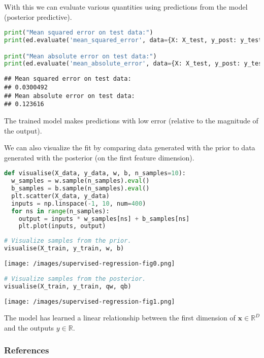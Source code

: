 With this we can evaluate various quantities using predictions from
the model (posterior predictive).
\begin{lstlisting}[language=Python]
print("Mean squared error on test data:")
print(ed.evaluate('mean_squared_error', data={X: X_test, y_post: y_test}))

print("Mean absolute error on test data:")
print(ed.evaluate('mean_absolute_error', data={X: X_test, y_post: y_test}))
\end{lstlisting}

\begin{lstlisting}
## Mean squared error on test data:
## 0.0300492
## Mean absolute error on test data:
## 0.123616
\end{lstlisting}

The trained model makes predictions with low error
(relative to the magnitude of the output).

We can also visualize the fit by comparing data generated with the
prior to data generated with the posterior (on the first feature
dimension).

\begin{lstlisting}[language=Python]
def visualise(X_data, y_data, w, b, n_samples=10):
  w_samples = w.sample(n_samples).eval()
  b_samples = b.sample(n_samples).eval()
  plt.scatter(X_data, y_data)
  inputs = np.linspace(-1, 10, num=400)
  for ns in range(n_samples):
    output = inputs * w_samples[ns] + b_samples[ns]
    plt.plot(inputs, output)
\end{lstlisting}

\begin{lstlisting}[language=Python]
# Visualize samples from the prior.
visualise(X_train, y_train, w, b)
\end{lstlisting}

\texttt{[image: /images/supervised-regression-fig0.png]}

\begin{lstlisting}[language=Python]
# Visualize samples from the posterior.
visualise(X_train, y_train, qw, qb)
\end{lstlisting}

\texttt{[image: /images/supervised-regression-fig1.png]}

The model has learned a linear relationship between the
first dimension of $\mathbf{x}\in\mathbb{R}^D$ and the outputs
$y\in\mathbb{R}$.

\subsubsection{References}\label{references}

